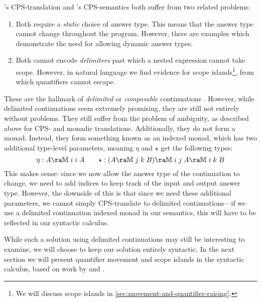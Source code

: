 \vspace*{1\baselineskip}

\citeauthor{barker2004}'s CPS-translation and
\citeauthor{moortgat2012}'s CPS-semantics both suffer from two related
problems:
\begin{enumerate}
\item Both require a \emph{static} choice of answer type. This
  means that the answer type cannot change throughout the
  program. However, there are examples which demonstrate the need for
  allowing dynamic answer types.
\item Both cannot encode \emph{delimiters} past which a nested
  expression cannot take scope. However, in natural language we find
  evidence for scope islands\footnote{%
    We will discuss scope islands in
    \autoref{sec:movement-and-quantifier-raising}.
  }, from which quantifiers cannot escape.
\end{enumerate}
These are the hallmark of \emph{delimited} or \emph{composable}
continuations \citep{danvy1990}. However, while delimited
continuations seem extremely promising, they are still not entirely
without problems. They still suffer from the problem of ambiguity, as
described above for CPS- and monadic translations. Additionally, they
do not form a monad. Instead, they form something known as an indexed
monad, which has two additional type-level parameters, meaning $\eta$
and $\star$ get the following types:
\[
  \eta : A\ra\mathbb{M}\;i\;i\;A
  \qquad
  \star: (A\ra\mathbb{M}\;j\;k\;B)\ra\mathbb{M}\;i\;j\;A\ra\mathbb{M}\;i\;k\;B
\]
This makes sense: since we now allow the answer type of the
continuation to change, we need to add indices to keep track of the
input and output answer type. However, the downside of this is that
since we need these additional parameters, we cannot simply
CPS-translate to delimited continuations---if we use a delimited
continuation indexed monad in our semantics, this will have to be
reflected in our syntactic calculus.

While such a solution using delimited continuations may still be
interesting to examine, we will choose to keep our solution entirely
syntactic. In the next section we will present quantifier movement and
scope islands in the syntactic calculus, based on work by
\citet{moortgat1996} and \citet{barker2015}.
